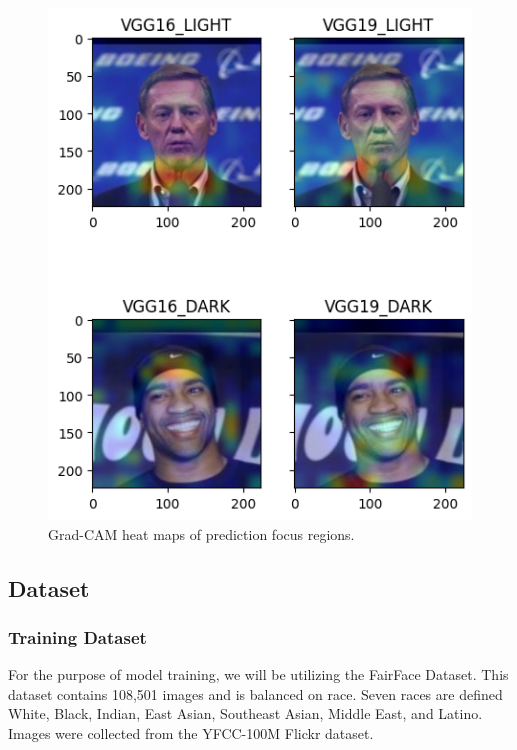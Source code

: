 \documentclass[conference]{IEEEtran}
\begin{document}
\begin{figure}
    \centerline{\includegraphics[width=0.8\linewidth]{latex/images/heatmap.png}}
    \caption{Grad-CAM heat maps of prediction focus regions.}
    \label{grad_cam}
\end{figure}

\subsection{Dataset}
\subsubsection{Training Dataset}
For the purpose of model training, we will be utilizing the FairFace Dataset\cite{karkkainen2021fairface}. This dataset contains 108,501 images and is balanced on race. Seven races are defined White, Black, Indian, East Asian, Southeast Asian, Middle East, and Latino. Images were collected from the YFCC-100M Flickr dataset\cite{thomee2016yfcc100m}.
\end{document}
